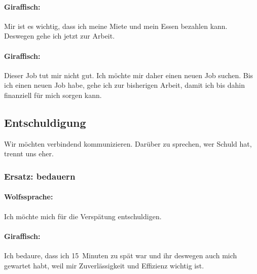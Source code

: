 \paragraph{Giraffisch:} Mir ist es wichtig, dass ich meine Miete und mein Essen bezahlen kann. Deswegen gehe ich jetzt zur Arbeit.

\paragraph{Giraffisch:} Dieser Job tut mir nicht gut. Ich möchte mir daher einen neuen Job suchen. Bis ich einen neuen Job habe, gehe ich zur bisherigen Arbeit, damit ich bis dahin finanziell für mich sorgen kann.


\subsection{Entschuldigung}

Wir möchten verbindend kommunizieren. Darüber zu sprechen, wer Schuld hat, trennt uns eher.

\subsubsection{Ersatz: bedauern}

\paragraph{Wolfssprache:} Ich möchte mich für die Verspätung entschuldigen.

\paragraph{Giraffisch:} Ich bedaure, dass ich 15~Minuten zu spät war und ihr deswegen auch mich gewartet habt, weil mir Zuverlässigkeit und Effizienz wichtig ist.
